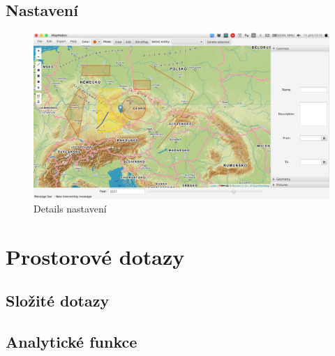 \documentclass[12pt,a4paper,titlepage]{article}
\begin{document}
\subsection{Nastavení}
\begin{figure}[!htbp]
	\centering
	\includegraphics[scale=0.25]{full_window}
	\caption{Details nastavení}
	\label{settings}
\end{figure}

\section{Prostorové dotazy}

\subsection{Složité dotazy}

\subsection{Analytické funkce}
\end{document}
